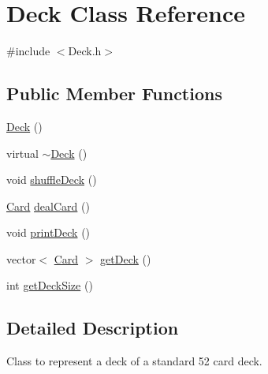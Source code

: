 \hypertarget{class_deck}{\section{Deck Class Reference}
\label{class_deck}
}


{\ttfamily \#include $<$Deck.\-h$>$}

\subsection*{Public Member Functions}
\begin{DoxyCompactItemize}
\item 
\hyperlink{class_deck_a57ae1cb4ac6fd61c249cefb2db85eb99}{Deck} ()
\item 
virtual \hyperlink{class_deck_a0455563eccd460a9ff84e74b858beb30}{$\sim$\-Deck} ()
\item 
void \hyperlink{class_deck_a44577729d5b8cc5f5b416adb46ac3cd5}{shuffle\-Deck} ()
\item 
\hyperlink{class_card}{Card} \hyperlink{class_deck_a7a0547af6395feb13f4402a2a63b79fe}{deal\-Card} ()
\item 
void \hyperlink{class_deck_a1737fb34704fc23e268725848ecd15ed}{print\-Deck} ()
\item 
vector$<$ \hyperlink{class_card}{Card} $>$ \hyperlink{class_deck_a4a2163e4829f910ec687311ddff45e98}{get\-Deck} ()
\item 
int \hyperlink{class_deck_ad775d4b99ec86991402ad12266b1b157}{get\-Deck\-Size} ()
\end{DoxyCompactItemize}


\subsection{Detailed Description}
Class to represent a deck of a standard 52 card deck. 

